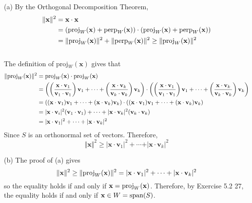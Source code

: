 (a) By the Orthogonal Decomposition Theorem, \begin{align*}
	\Vert \textbf{x} \Vert ^ 2 &= \textbf{x} \cdot \textbf{x} \\
	&= (\textnormal{proj}_W(\textbf{x}) + \textnormal{perp}_W(\textbf{x})) \cdot  (\textnormal{proj}_W(\textbf{x}) + \textnormal{perp}_W(\textbf{x})) \\
	&= \Vert \textnormal{proj}_W(\textbf{x}) \Vert^2 + \Vert \textnormal{perp}_W(\textbf{x}) \Vert^2 \ge \Vert \textnormal{proj}_W(\textbf{x}) \Vert^2
\end{align*}\\
The definition of proj$_W(\textbf{x})$ gives that \begin{align*}
	\Vert \textnormal{proj}_W(\textbf{x}) \Vert ^ 2 &= \textnormal{proj}_W(\textbf{x}) \cdot\textnormal{proj}_W(\textbf{x}) \\
	&= \left( \left (\frac{\textbf{x} \cdot \textbf{v}_1}{\textbf{v}_1 \cdot \textbf{v}_1} \right)\textbf{v}_1 + \cdots + \left (\frac{\textbf{x} \cdot \textbf{v}_k}{\textbf{v}_k \cdot \textbf{v}_k} \right)\textbf{v}_k \right) \cdot \left( \left (\frac{\textbf{x} \cdot \textbf{v}_1}{\textbf{v}_1 \cdot \textbf{v}_1} \right)\textbf{v}_1 + \cdots + \left (\frac{\textbf{x} \cdot \textbf{v}_k}{\textbf{v}_k \cdot \textbf{v}_k} \right)\textbf{v}_k \right) \\
	&= \left( (\textbf{x} \cdot \textbf{v}_1)\textbf{v}_1 + \cdots + (\textbf{x} \cdot \textbf{v}_k)\textbf{v}_k \right) \cdot \left( (\textbf{x} \cdot \textbf{v}_1)\textbf{v}_1 + \cdots + (\textbf{x} \cdot \textbf{v}_k)\textbf{v}_k \right) \\
	&= \vert \textbf{x} \cdot \textbf{v}_i \vert^2 (\textbf{v}_1 \cdot \textbf{v}_1) + \cdots + \vert \textbf{x} \cdot \textbf{v}_k \vert^2 (\textbf{v}_k \cdot \textbf{v}_k) \\
	&= \vert \textbf{x} \cdot \textbf{v}_1 \vert ^ 2 + \cdots + \vert \textbf{x} \cdot \textbf{v}_k \vert ^2
\end{align*} Since $S$ is an orthonormal set of vectors. Therefore, \begin{equation*}
	\Vert \textbf{x} \Vert ^ 2 \ge \vert \textbf{x} \cdot \textbf{v}_1 \vert ^ 2 + \cdots + \vert \textbf{x} \cdot \textbf{v}_k \vert ^2
\end{equation*}

(b) The proof of (a) gives \begin{equation*}
	\Vert \textbf{x} \Vert ^ 2 \ge \Vert \textnormal{proj}_W(\textbf{x}) \Vert^2 = \vert \textbf{x} \cdot \textbf{v}_1 \vert ^ 2 + \cdots + \vert \textbf{x} \cdot \textbf{v}_k \vert ^2
\end{equation*} so the equality holds if and only if $\textbf{x} = \textnormal{proj}_W(\textbf{x})$. Therefore, by Exercise 5.2 27, the equality holds if and only if $\textbf{x} \in W = \textnormal{span}(S)$.\\

